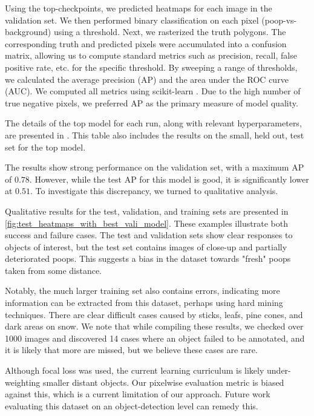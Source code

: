 \documentclass[10pt,twocolumn,letterpaper]{article}
\begin{document}
Using the top-checkpoints, we predicted heatmaps for each image in the validation set.
We then performed binary classification on each pixel (poop-vs-background) using a threshold.
Next, we rasterized the truth polygons.
The corresponding truth and predicted pixels were accumulated into a confusion matrix, allowing us to
  compute standard metrics such as precision, recall, false positive rate, etc.
\cite{powers_evaluation_2011} for the specific threshold.
By sweeping a range of thresholds, we calculated the average precision (AP) and the area under the ROC curve
  (AUC).
We computed all metrics using scikit-learn \cite{scikit-learn}.
Due to the high number of true negative pixels, we preferred AP as the primary measure of model quality.
  

The details of the top model for each run, along with relevant hyperparameters, are presented in
  .
This table also includes the results on the small, held out, test set for the top model.

The results show strong performance on the validation set, with a maximum AP of $0.78$.
However, while the test AP for this model is good, it is significantly lower at $0.51$.
To investigate this discrepancy, we turned to qualitative analysis.

Qualitative results for the test, validation, and training sets are presented in
  \cref{fig:test_heatmaps_with_best_vali_model}.
These examples illustrate both success and failure cases.
The test and validation sets show clear responses to objects of interest, but the test set contains images
  of close-up and partially deteriorated poops.
This suggests a bias in the dataset towards "fresh" poops taken from some distance.

Notably, the much larger training set also contains errors, indicating more information can be extracted
  from this dataset, perhaps using hard mining techniques.
There are clear difficult cases caused by sticks, leafs, pine cones, and dark areas on snow.
We note that while compiling these results, we checked over 1000 images and discovered 14 cases where an
  object failed to be annotated, and it is likely that more are missed, but we believe these cases are rare.

Although focal loss was used, the current learning curriculum is likely under-weighting smaller distant
  objects.
Our pixelwise evaluation metric is biased against this, which is a current limitation of our approach.
Future work evaluating this dataset on an object-detection level can remedy this.
\end{document}
